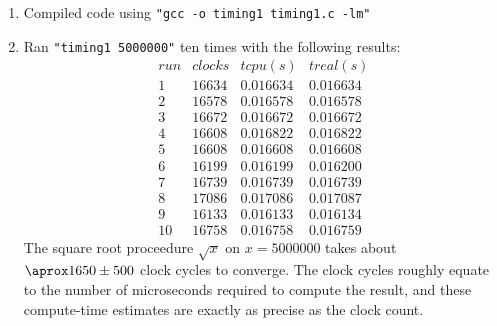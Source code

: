 \documentclass[12pt,fleqn,leqno,letterpaper]{article}
\begin{document}
\begin{enumerate}
    \item Compiled code using \texttt{"gcc -o timing1 timing1.c -lm"}

    \item Ran \texttt{"timing1 5000000"} ten times with the following results:\\
        $$
        \begin{array}{lccc}
            run & clocks & t cpu (s) & t real (s) \\
            1 & 16634 & 0.016634 & 0.016634 \\
            2 & 16578 & 0.016578 & 0.016578 \\
            3 & 16672 & 0.016672 & 0.016672 \\
            4 & 16608 & 0.016822 & 0.016822 \\
            5 & 16608 & 0.016608 & 0.016608 \\
            6 & 16199 & 0.016199 & 0.016200 \\
            7 & 16739 & 0.016739 & 0.016739 \\
            8 & 17086 & 0.017086 & 0.017087 \\
            9 & 16133 & 0.016133 & 0.016134 \\
            10 & 16758 & 0.016758 & 0.016759
        \end{array}
        $$
        The square root proceedure $\sqrt{x}$ on $x=5000000$ takes about
        $\aprox1650\pm 500$ clock cycles to converge. The clock cycles roughly
        equate to the number of microseconds required to compute the result, and
        these compute-time estimates are exactly as precise as the clock count.


\end{enumerate}
\end{document}
